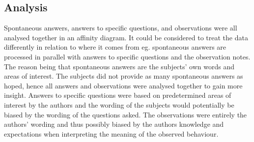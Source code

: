\subsection{Analysis}
Spontaneous answers, answers to specific questions, and observations were all analysed together in an affinity diagram. It could be considered to treat the data differently in relation to where it comes from eg. spontaneous answers are processed in parallel with answers to specific questions and the observation notes. The reason being that spontaneous answers are the subjects' own words and areas of interest. The subjects did not provide as many spontaneous answers as hoped, hence all answers and observations were analysed together to gain more insight. Answers to specific questions were based on predetermined areas of interest by the authors and the wording of the subjects would potentially be biased by the wording of the questions asked. The observations were entirely the authors' wording and thus possibly biased by the authors knowledge and expectations when interpreting the meaning of the observed behaviour.